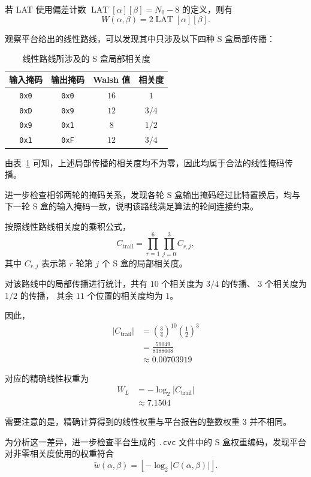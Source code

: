 若 LAT 使用偏差计数
$\operatorname{LAT}[\alpha][\beta]=N_0-8$
的定义，则有
\[
W(\alpha,\beta)
=2\operatorname{LAT}[\alpha][\beta].
\]

观察平台给出的线性路线，可以发现其中只涉及以下四种 S 盒局部传播：

\begin{table}[htbp]
\centering
\caption{线性路线所涉及的 S 盒局部相关度}
\label{tab:cipherfour-local-correlation}
\begin{tabular}{c|c|c|c}
\hline
输入掩码 & 输出掩码 & Walsh 值 & 相关度 \\
\hline
\texttt{0x0} & \texttt{0x0} & $16$ & $1$ \\
\texttt{0xD} & \texttt{0x9} & $12$ & $3/4$ \\
\texttt{0x9} & \texttt{0x1} & $8$ & $1/2$ \\
\texttt{0x1} & \texttt{0xF} & $12$ & $3/4$ \\
\hline
\end{tabular}
\end{table}

由表~\ref{tab:cipherfour-local-correlation} 可知，上述局部传播的相关度均不为零，因此均属于合法的线性掩码传播。

进一步检查相邻两轮的掩码关系，发现各轮 S 盒输出掩码经过比特置换后，均与下一轮 S 盒的输入掩码一致，说明该路线满足算法的轮间连接约束。

按照线性路线相关度的乘积公式，
\[
C_{\mathrm{trail}}
=
\prod_{r=1}^{6}\prod_{j=0}^{3}C_{r,j},
\]
其中 $C_{r,j}$ 表示第 $r$ 轮第 $j$ 个 S 盒的局部相关度。

对该路线中的局部传播进行统计，共有
$10$ 个相关度为 $3/4$ 的传播、
$3$ 个相关度为 $1/2$ 的传播，
其余 $11$ 个位置的相关度均为 $1$。

因此，
\[
\begin{aligned}
|C_{\mathrm{trail}}|
&=\left(\frac34\right)^{10}
  \left(\frac12\right)^3\\
&=\frac{59049}{8388608}\\
&\approx 0.00703919
\end{aligned}
\]

对应的精确线性权重为
\[
\begin{aligned}
W_L
&=-\log_2|C_{\mathrm{trail}}|\\
&\approx 7.1504
\end{aligned}
\]

需要注意的是，精确计算得到的线性权重与平台报告的整数权重 $3$ 并不相同。

为分析这一差异，进一步检查平台生成的 \texttt{.cvc} 文件中的 S 盒权重编码，发现平台对非零相关度使用的权重符合
\[
\widetilde{w}(\alpha,\beta)
=
\left\lfloor
-\log_2|C(\alpha,\beta)|
\right\rfloor.
\]


